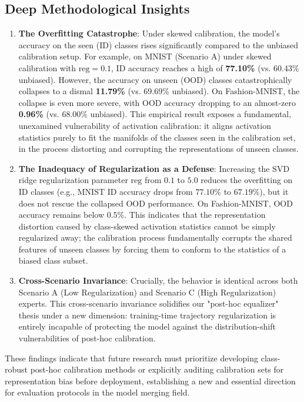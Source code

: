 \documentclass{article}
\theoremstyle{plain}
\theoremstyle{definition}
\theoremstyle{remark}
\begin{document}
\subsection{Deep Methodological Insights}
\begin{enumerate}
    \item \textbf{The Overfitting Catastrophe}: Under skewed calibration, the model's accuracy on the seen (ID) classes rises significantly compared to the unbiased calibration setup. For example, on MNIST (Scenario A) under skewed calibration with $\text{reg}=0.1$, ID accuracy reaches a high of \textbf{77.10\%} (vs. 60.43\% unbiased). However, the accuracy on unseen (OOD) classes catastrophically collapses to a dismal \textbf{11.79\%} (vs. 69.69\% unbiased). On Fashion-MNIST, the collapse is even more severe, with OOD accuracy dropping to an almost-zero \textbf{0.96\%} (vs. 68.00\% unbiased). This empirical result exposes a fundamental, unexamined vulnerability of activation calibration: it aligns activation statistics purely to fit the manifolds of the classes seen in the calibration set, in the process distorting and corrupting the representations of unseen classes.
    \item \textbf{The Inadequacy of Regularization as a Defense}: Increasing the SVD ridge regularization parameter $\text{reg}$ from $0.1$ to $5.0$ reduces the overfitting on ID classes (e.g., MNIST ID accuracy drops from $77.10\%$ to $67.19\%$), but it does not rescue the collapsed OOD performance. On Fashion-MNIST, OOD accuracy remains below $0.5\%$. This indicates that the representation distortion caused by class-skewed activation statistics cannot be simply regularized away; the calibration process fundamentally corrupts the shared features of unseen classes by forcing them to conform to the statistics of a biased class subset.
    \item \textbf{Cross-Scenario Invariance}: Crucially, the behavior is identical across both Scenario A (Low Regularization) and Scenario C (High Regularization) experts. This cross-scenario invariance solidifies our "post-hoc equalizer" thesis under a new dimension: training-time trajectory regularization is entirely incapable of protecting the model against the distribution-shift vulnerabilities of post-hoc calibration.
\end{enumerate}

These findings indicate that future research must prioritize developing class-robust post-hoc calibration methods or explicitly auditing calibration sets for representation bias before deployment, establishing a new and essential direction for evaluation protocols in the model merging field.
\end{document}

